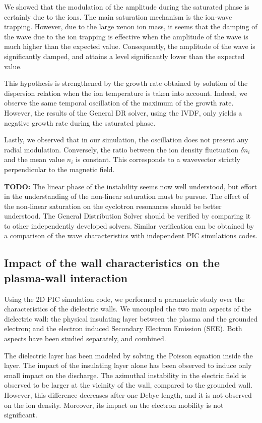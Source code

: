 We showed that the modulation of the amplitude during the saturated phase is certainly due to the ions.
The main saturation mechanism is the ion-wave trapping.
However, due to the large xenon ion mass, it seems that the damping of the wave due to the ion trapping is effective when the amplitude of the wave is much higher than the expected value.
Consequently, the amplitude of the wave is significantly damped, and attains a level significantly lower than the expected value.

This hypothesis is strengthened by the growth rate obtained by solution of the dispersion relation when the ion temperature is taken into account.
Indeed, we observe the same temporal oscillation of the maximum of the  growth rate.
However, the results of the General DR solver, using the IVDF, only yields a negative growth rate during the saturated phase.

Lastly, we observed that in our simulation, the oscillation does not present any radial modulation.
Conversely, the ratio between the ion density fluctuation $\delta n_i$ and the mean value $n_i$ is constant. 
This corresponds to a wavevector strictly perpendicular to the magnetic field.

{\bf TODO:} The linear phase of the instability seems now well understood, but effort in the understanding of the non-linear saturation must be pursue.
The effect of the non-linear saturation on the cyclotron resonances should be better understood.
The General Distribution Solver should be verified by comparing it to other independently developed solvers.
Similar verification can be obtained by a comparison of the wave characteristics with independent PIC simulations codes.

\subsection{Impact of the wall characteristics on the plasma-wall interaction }
Using the 2D PIC simulation code, we performed a parametric study over the characteristics of the dielectric walls.
We uncoupled the two main aspects of the dielectric wall\string: the physical insulating layer between the plasma and the grounded electron; and the electron induced Secondary Electron Emission (SEE).
Both aspects have been studied separately, and combined.

The dielectric layer has been modeled by solving the Poisson equation inside the layer.
The impact of the insulating layer alone has been observed to induce only small impact on the discharge.
The azimuthal instability in the electric field is observed to be larger at the vicinity of the wall, compared to the grounded wall.
However, this difference decreases after one Debye length, and it is not observed on the ion density.
Moreover, its impact on the electron mobility is not significant.

